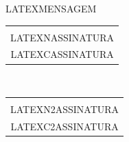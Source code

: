 \documentclass[12pt]{artigo}
\begin{document}
\vspace*{.8cm}
\timbrado
\noindent
\begin{linenumbers}
LATEXMENSAGEM 
\end{linenumbers}
\vspace*{15mm} 
\begin{center} 
\setlength{\baselineskip}{6mm}
\begin{tabular}{c}
\hline \vspace*{-4mm} \\
LATEXNASSINATURA \\
{\small LATEXCASSINATURA}
\end{tabular} \\
\vspace*{15mm} 
\begin{tabular}{c}
\hline \vspace*{-4mm} \\
LATEXN2ASSINATURA \\
{\small LATEXC2ASSINATURA}
\end{tabular}
%
\end{center}
\end{document}
